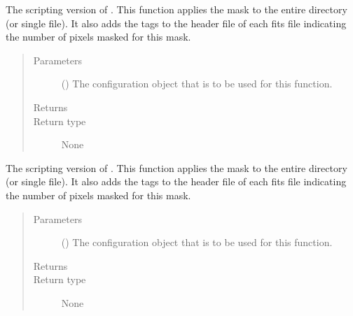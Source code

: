 \documentclass[letterpaper,10pt,english]{sphinxmanual}
\begin{document}

\begin{fulllineitems}
\label{\detokenize{docstrings/ifa_smeargle.masking.scripting:ifa_smeargle.masking.scripting.script_mask_everything}}
The scripting version of . This function
applies the mask to the entire directory (or single file). It
also adds the tags to the header file of each fits file
indicating the number of pixels masked for this mask.
\begin{quote}\begin{description}
\item[{Parameters}] \leavevmode
{} () \textendash{} The configuration object that is to be used for this
function.

\item[{Returns}] \leavevmode


\item[{Return type}] \leavevmode
None

\end{description}\end{quote}

\end{fulllineitems}


\begin{fulllineitems}
\label{\detokenize{docstrings/ifa_smeargle.masking.scripting:ifa_smeargle.masking.scripting.script_mask_nothing}}
The scripting version of . This function
applies the mask to the entire directory (or single file). It
also adds the tags to the header file of each fits file
indicating the number of pixels masked for this mask.
\begin{quote}\begin{description}
\item[{Parameters}] \leavevmode
{} () \textendash{} The configuration object that is to be used for this
function.

\item[{Returns}] \leavevmode


\item[{Return type}] \leavevmode
None

\end{description}\end{quote}

\end{fulllineitems}
\end{document}
